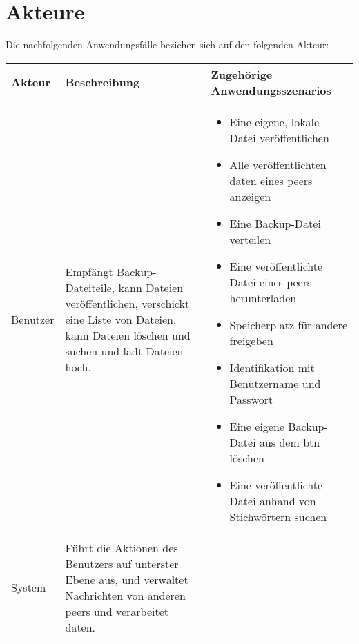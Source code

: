\section{Akteure}
 Die nachfolgenden Anwendungsfälle beziehen sich auf den folgenden Akteur:

{\small
\begin{center}
   \begin{tabular}{|l|l|l|}
   \hline
		Akteur		& Beschreibung & Zugehörige Anwendungsszenarios \\
   \hline
		Benutzer	& \begin{minipage}{3.5cm}
					\vspace{0.1cm}
                       Empfängt Backup-Dateiteile, kann Dateien veröffentlichen, 
                       verschickt eine Liste von Dateien, kann Dateien löschen und suchen und lädt Dateien hoch.
                 \end{minipage}
                 \vspace{0.1cm}
               & \begin{minipage}{10cm}
					\vspace{0.1cm}
					\begin{itemize}
						\item Eine eigene, lokale Datei veröffentlichen
						\item Alle veröffentlichten \gls{daten} eines \gls{peer}s anzeigen
						\item Eine Backup-Datei verteilen
						\item Eine veröffentlichte Datei eines \gls{peer}s herunterladen
						\item Speicherplatz für andere freigeben
						\item Identifikation mit Benutzername und Passwort
						\item Eine eigene Backup-Datei aus dem \gls{btn} löschen
						\item Eine veröffentlichte Datei anhand von Stichwörtern suchen
					\end{itemize}
                    \vspace{0.1cm}
                    \end{minipage}\\[0.1cm]
	\hline
		System		& \begin{minipage}{3.5cm}
					\vspace{0.1cm}
						Führt die Aktionen des Benutzers auf unterster Ebene aus, und verwaltet Nachrichten von anderen \gls{peer}s und verarbeitet \gls{daten}.
                 \end{minipage}

\end{tabular}
\end{center}}
